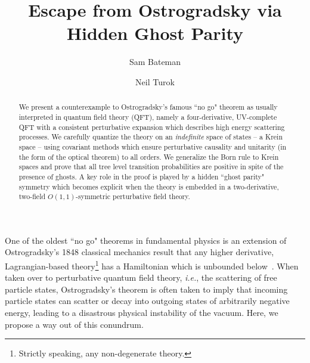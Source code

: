 \documentclass[pra,aps,amsmath,amssymb,notitlepage, twocolumn,superscriptaddress,longbibliography,nofootinbib,floatfix,10pt]{revtex4-2}
\begin{document}

\title{Escape from Ostrogradsky via Hidden Ghost Parity}

\author{Sam Bateman}\affiliation{\Edinburgh}
\author{Neil Turok}\affiliation{\Edinburgh}\affiliation{\PI}
\newcommand*{\Edinburgh}{Higgs Centre for Theoretical Physics, University of Edinburgh, EH9 3FD, UK} 
\newcommand*{\PI}{Perimeter Institute for Theoretical Physics, Waterloo, Ontario N2L 2Y5, Canada}
\begin{abstract}
We present a counterexample to Ostrogradsky's famous ``no go" theorem as usually interpreted in quantum field theory (QFT), namely a four-derivative, UV-complete QFT with a consistent perturbative expansion which describes high energy scattering processes. We carefully quantize the theory on an {\it indefinite} space of states -- a Krein space -- using covariant methods which ensure perturbative causality and unitarity (in the form of the optical theorem) to all orders. We generalize the Born rule to Krein spaces and prove that all tree level transition probabilities are positive in spite of the presence of ghosts. A key role in the proof is played by a hidden ``ghost parity" symmetry 
which becomes explicit when the theory is embedded in a two-derivative, two-field $O(1,1)$-symmetric perturbative field theory. 
\end{abstract}

\maketitle 
\newpage




One of the oldest ``no go" theorems in fundamental physics is an extension of Ostrogradsky's 1848 classical mechanics result that any higher derivative, Lagrangian-based theory\footnote{Strictly speaking, any non-degenerate theory.} has a Hamiltonian which is unbounded below~\cite{Ostrogradsky:1850fid}. When taken over to perturbative quantum field theory, {\it i.e.}, the scattering of free particle states, Ostrogradsky's theorem is often taken to imply that incoming particle states can scatter or decay into outgoing states of arbitrarily negative energy, leading to a disastrous physical instability of the vacuum. Here, we propose a way out of this conundrum. 
\end{document}
